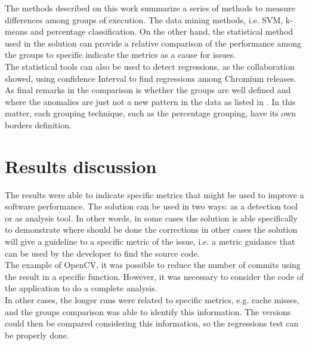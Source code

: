 The methods described on this work summarize a series of methods to measure differences among groups of execution. The data mining methods, i.e. SVM, k-means and percentage classification. On the other hand, the statistical method used in the solution can provide a relative comparison of the performance among the groups to specific indicate the metrics as a cause for issues.\\
The statistical tools can also be used to detect regressions, as the collaboration \cite{google_releases} showed, using confidence Interval to find regressions among Chromium releases. 
As final remarks in the comparison is whether the groups are well defined and where the anomalies are just not a new pattern in the data as listed in \cite{Chandola2009ADS15418801541882}. In this matter, each grouping technique, such as the percentage grouping, have its own borders definition.
\section{Results discussion}
The results were able to indicate specific metrics that might be used to improve a software performance. The solution can be used in two ways: as a detection tool or as analysis tool. In other words, in some cases the solution is able specifically to demonstrate where should be done the corrections in other cases the solution will give a guideline to a specific metric of the issue, i.e. a metric guidance that can be used by the developer to find the source code.\\
The example of OpenCV, it was possible to reduce the number of commits using the result in a specific function. However, it was necessary to consider the code of the application to do a complete analysis.\\
In other cases, the longer runs were related to specific metrics, e.g. cache misses, and the groups comparison was able to identify this information. The versions could then be compared considering this information, so the regressions test can be properly done.
